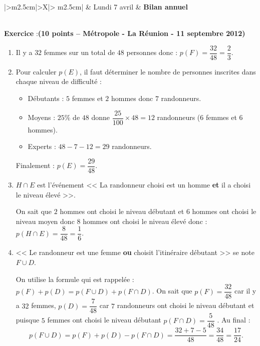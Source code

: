 \documentclass[12pt,french]{article}
\newcounter{exoc}
\newenvironment{exoc}[1]{%
  \refstepcounter{exoc}\textbf{Exercice \theexoc} :\hfill {\footnotesize\textbf{(#1)}}\par
  \medskip}%
{\medskip}
\begin{document}
\begin{center}
\begin{tabularx}{\textwidth}{|>\centering m{2.5cm}|>\centering X|>{\centering\arraybackslash} m{2.5cm}|}
	\iere {} &  Lundi 7 avril  & \textbf{Bilan annuel} \\
	\hline
		 \\
	\hline
\end{tabularx}
\end{center}\bigskip

\begin{exoc}{10 points -- Métropole - La Réunion - 11 septembre 2012}
    \begin{enumerate}
        \item Il y a $32$ femmes sur un total de $48$ personnes donc :
        $p(F) = \dfrac{32}{48} = \dfrac 23.$
        \item Pour calculer $p(E)$, il faut déterminer le nombre de personnes inscrites dans chaque niveau de difficulté :
        \begin{itemize}
        	\item Débutants : $5$ femmes et $2$ hommes donc $7$ randonneurs.
        	\item Moyens : $25 \%$ de $48$ donne $\dfrac{25}{100} \times 48 = 12$ randonneurs ($6$ femmes et $6$ hommes).
        	\item Experts : $48 - 7 - 12 = 29$ randonneurs.
        \end{itemize}
        Finalement : $p(E) = \dfrac{29}{48}$.

        \item $H \cap E$ est l'événement << La randonneur choisi est un homme \textbf{et} il a choisi le niveau élevé >>.\par On sait que $2$ hommes ont choisi le niveau débutant et $6$ hommes ont choisi le niveau moyen donc $8$ hommes ont choisi le niveau élevé donc : $p(H \cap E) = \dfrac{8}{48} = \dfrac 16$.

        \item << Le randonneur est une femme \textbf{ou} choisit l'itinéraire débutant >> se note $F \cup D$.\par On utilise la formule qui est rappelée : $p(F) + p(D) = p(F \cup D) + p(F \cap D)$. On sait que $p(F) =\dfrac{32}{48}$ car il y a $32$ femmes, $p(D) = \dfrac{7}{48}$ car $7$ randonneurs ont choisi le niveau débutant et puisque $5$ femmes ont choisi le niveau débutant $p(F \cap D) = \dfrac{5}{48}$ . Au final :
        \[p(F \cup D) = p(F) + p(D) - p(F \cap D) = \dfrac{32 + 7 - 5}{48} = \dfrac{34}{48} = \dfrac{17}{24}.\]


\end{enumerate}
\end{exoc}
\end{document}
